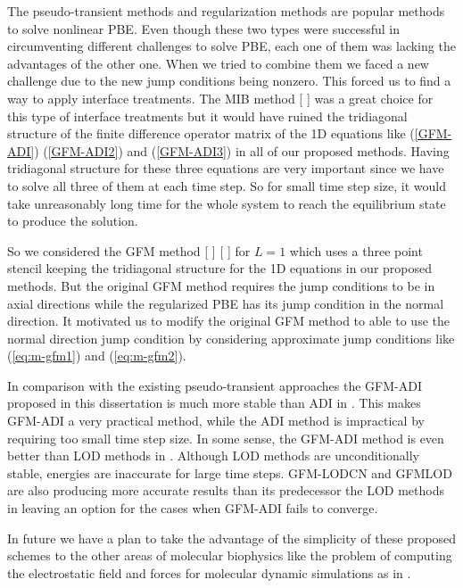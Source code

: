 The pseudo-transient methods and regularization methods are popular methods to solve nonlinear PBE. Even though these two types were successful in circumventing different challenges to solve PBE, each one of them was lacking the advantages of the other one. When we tried to combine them we faced a new challenge due to  the new jump conditions being nonzero. This forced us to find a way to apply interface treatments. The MIB method [ ] was a great choice for this type of interface treatments but it would have ruined the tridiagonal structure of the finite difference operator matrix of the 1D equations like (\ref{GFM-ADI}) (\ref{GFM-ADI2}) and (\ref{GFM-ADI3}) in all of our proposed methods. Having tridiagonal structure for these three equations are very important since we have to solve all three of them at each time step. So for small time step size, it would take unreasonably long time for the whole system to reach the equilibrium state to produce the solution.   

So we considered the GFM method [ ] [ ] for $L=1$ which uses a three point stencil keeping the tridiagonal structure for the 1D equations in our proposed methods. But the original GFM method requires the jump conditions to be in axial directions while the regularized PBE has its jump condition in the normal direction. It motivated us to modify the original GFM  method to able to use the normal direction jump condition by considering approximate jump conditions like (\ref{eq:m-gfm1}) and (\ref{eq:m-gfm2}). 

In comparison with the existing pseudo-transient approaches the GFM-ADI proposed in this dissertation is much more stable than ADI in \cite{geng_fully_2013}. This makes GFM-ADI a very practical method, while the ADI method is impractical by requiring too small time step size. In some sense, the GFM-ADI method is even better than LOD methods in \cite{Wilson2016}. Although LOD methods are unconditionally stable, energies are inaccurate for large time steps. GFM-LODCN and GFMLOD are also producing more accurate results than its predecessor the LOD methods in \cite{Wilson2016} leaving an option for the cases when GFM-ADI fails to converge. 

In future we have a plan to take the advantage of the simplicity of these proposed schemes to the other areas of molecular biophysics like the problem of computing the electrostatic field and forces for molecular dynamic simulations as in \cite{GENG_WEI2011}. 
 